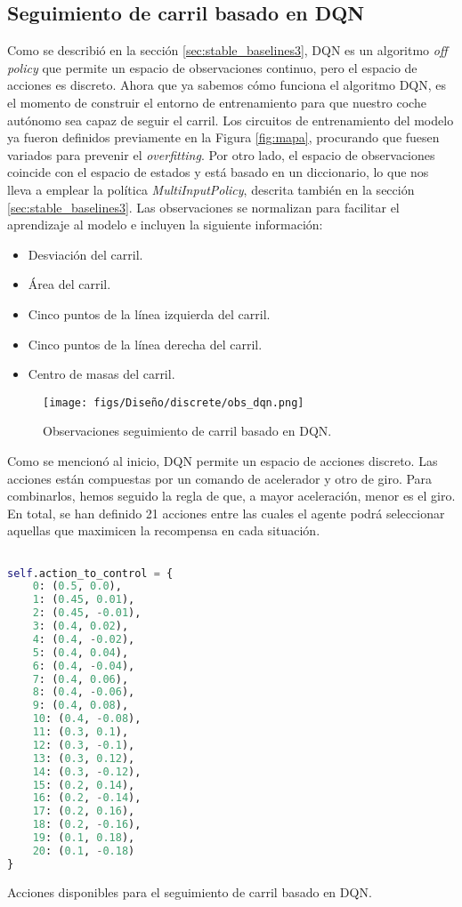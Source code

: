 \subsection{Seguimiento de carril basado en DQN}

Como se describió en la sección \ref{sec:stable_baselines3}, \ac{DQN} es un algoritmo \textit{off policy} que permite un espacio de observaciones continuo, pero el espacio de acciones es discreto. Ahora que ya sabemos cómo funciona el algoritmo \ac{DQN}, es el momento de construir el entorno de entrenamiento para que nuestro coche autónomo sea capaz de seguir el carril. Los circuitos de entrenamiento del modelo ya fueron definidos previamente en la Figura \ref{fig:mapa}, procurando que fuesen variados para prevenir el \textit{overfitting}. Por otro lado, el espacio de observaciones coincide con el espacio de estados y está basado en un diccionario, lo que nos lleva a emplear la política \textit{MultiInputPolicy}, descrita también en la sección \ref{sec:stable_baselines3}. Las observaciones se normalizan para facilitar el aprendizaje al modelo e incluyen la siguiente información:
\begin{itemize}
		\item Desviación del carril.
		\item Área del carril.
		\item Cinco puntos de la línea izquierda del carril.
		\item Cinco puntos de la línea derecha del carril.
		\item Centro de masas del carril.
\end{itemize}

\begin{figure}[ht]
  \centering
  \texttt{[image: figs/Diseño/discrete/obs\_dqn.png]}
  \caption{Observaciones seguimiento de carril basado en \ac{DQN}.}
  \label{fig:dqn_obs}
\end{figure}

Como se mencionó al inicio, \ac{DQN} permite un espacio de acciones discreto. Las acciones están compuestas por un comando de acelerador y otro de giro. Para combinarlos, hemos seguido la regla de que, a mayor aceleración, menor es el giro. En total, se han definido 21 acciones entre las cuales el agente podrá seleccionar aquellas que maximicen la recompensa en cada situación.
\begin{code}[h]
\begin{lstlisting}[language=Python]

self.action_to_control = {
    0: (0.5, 0.0),
    1: (0.45, 0.01), 
    2: (0.45, -0.01),
    3: (0.4, 0.02),
    4: (0.4, -0.02),
    5: (0.4, 0.04),
    6: (0.4, -0.04),
    7: (0.4, 0.06),
    8: (0.4, -0.06),
    9: (0.4, 0.08),
    10: (0.4, -0.08),
    11: (0.3, 0.1),
    12: (0.3, -0.1),
    13: (0.3, 0.12),
    14: (0.3, -0.12),
    15: (0.2, 0.14),
    16: (0.2, -0.14),
    17: (0.2, 0.16),
    18: (0.2, -0.16),
    19: (0.1, 0.18),
    20: (0.1, -0.18)
}
\end{lstlisting}
\caption[Acciones disponibles para el seguimiento de carril basado en \ac{DQN}]{Acciones disponibles para el seguimiento de carril basado en \ac{DQN}.}
\label{cod:acc_dqn}
\end{code}


